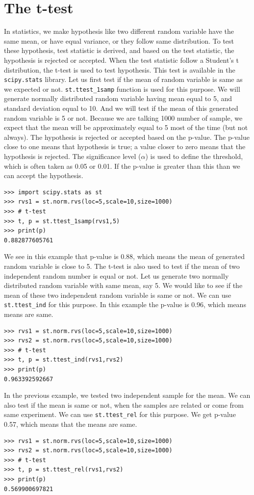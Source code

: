 \documentclass[10pt]{book}
\begin{document}
{\section{The t-test}
In statistics, we make hypothesis like two different random variable have the same mean, or have equal variance, or they follow same distribution. To test these hypothesis, test statistic is derived, and based on the test statistic, the hypothesis is rejected or accepted. When the test statistic follow a Student's t distribution, the t-test is used to test hypothesis. This test is available in the \verb"scipy.stats" library. Let us first test if the mean of random variable is same as we expected or not. \verb"st.ttest_1samp" function is used for this purpose. We will generate normally distributed random variable having mean equal to 5, and standard deviation equal to 10. And we will test if the mean of this generated random variable is 5 or not. Because we are talking 1000 number of sample, we expect that the mean will be approximately equal to 5 most of the time (but not always). The hypothesis is rejected or accepted based on the p-value. The p-value close to one means that hypothesis is true; a value 
closer to zero means that the hypothesis is rejected. The significance level ($\alpha$) is used to define the threshold, which is often taken as 0.05 or 0.01. If the p-value is greater than this than we can accept the hypothesis. 
\beforeverb \begin{verbatim}
>>> import scipy.stats as st
>>> rvs1 = st.norm.rvs(loc=5,scale=10,size=1000)
>>> # t-test
>>> t, p = st.ttest_1samp(rvs1,5)
>>> print(p)
0.882877605761
\end{verbatim} \afterverb
We see in this example that p-value is 0.88, which means the mean of generated random variable is close to 5. The t-test is also used to test if the mean of two independent random number is equal or not. Let us generate two normally distributed random variable with same mean, say 5. We would like to see if the mean of these two independent random variable is same or not. We can use \verb"st.ttest_ind" for this purpose. In this example the p-value is 0.96, which means means are same.
\beforeverb \begin{verbatim}
>>> rvs1 = st.norm.rvs(loc=5,scale=10,size=1000)
>>> rvs2 = st.norm.rvs(loc=5,scale=10,size=1000)
>>> # t-test
>>> t, p = st.ttest_ind(rvs1,rvs2)
>>> print(p)
0.963392592667
\end{verbatim} \afterverb

In the previous example, we tested two independent sample for the mean. We can also test if the mean is same or not, when the samples are related or come from same experiment. We can use \verb"st.ttest_rel" for this purpose. We get p-value 0.57, which means that the means are same.
\beforeverb \begin{verbatim}
>>> rvs1 = st.norm.rvs(loc=5,scale=10,size=1000)
>>> rvs2 = st.norm.rvs(loc=5,scale=10,size=1000)
>>> # t-test
>>> t, p = st.ttest_rel(rvs1,rvs2)
>>> print(p)
0.569900697821
\end{verbatim} \afterverb

}
\end{document}
